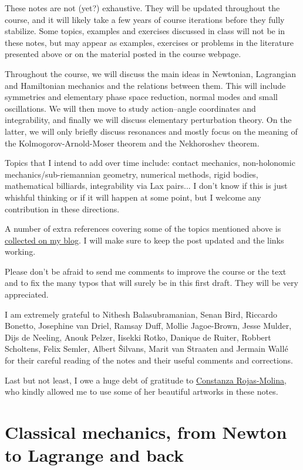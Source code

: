 \documentclass[english,fontsize=11pt,paper=b5]{scrbook}
\theoremstyle{definition}
\begin{document}
  These notes are not (yet?) exhaustive.
  They will be updated throughout the course, and it will likely take a few years of course iterations before they fully stabilize.
  Some topics, examples and exercises discussed in class will not be in these notes, but may appear as examples, exercises or problems in the literature presented above or on the material posted in the course webpage.

  Throughout the course, we will discuss the main ideas in Newtonian, Lagrangian and Hamiltonian mechanics and the relations between them.
  This will include symmetries and elementary phase space reduction, normal modes and small oscillations.
  We will then move to study action--angle coordinates and integrability, and finally we will discuss elementary perturbation theory.
  On the latter, we will only briefly discuss resonances and mostly focus on the meaning of the Kolmogorov-Arnold-Moser theorem and the Nekhoroshev theorem.

  Topics that I intend to add over time include: contact mechanics, non-holonomic mechanics/sub-riemannian geometry, numerical methods, rigid bodies, mathematical billiards, integrability via Lax pairs... I don't know if this is just whishful thinking or if it will happen at some point, but I welcome any contribution in these directions.

  A number of extra references covering some of the topics mentioned above is \href{https://www.mseri.me/links-from-hm/}{collected on my blog}. I will make sure to keep the post updated and the links working. \medskip

  Please don't be afraid to send me comments to improve the course or the text and to fix the many typos that will surely be in this first draft. They will be very appreciated.

  I am extremely grateful to Nithesh Balasubramanian, Senan Bird, Riccardo Bonetto, Josephine van Driel, Ramsay Duff, Mollie Jagoe-Brown, Jesse Mulder, Dijs de Neeling, Anouk Pelzer, Iisekki Rotko, Danique de Ruiter, Robbert Scholtens, Felix Semler, Albert \v{S}ilvans, Marit van Straaten and Jermain Wall\'e for their careful reading of the notes and their useful comments and corrections.

  Last but not least, I owe a huge debt of gratitude to \href{https://crojasmolina.com}{Constanza Rojas-Molina}, who kindly allowed me to use some of her beautiful artworks in these notes.

  \chapter{Classical mechanics, from Newton to Lagrange and back}
\end{document}
